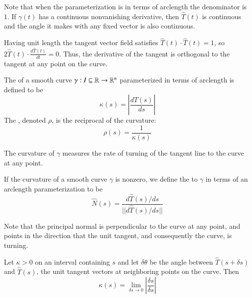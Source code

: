 \documentclass[12pt, a4paper, oneside, openright, titlepage]{book}
\begin{document}
\begin{appendices}
    Note that when the parameterization is in terms of arclength the denominator is $1$. If $\gamma(t)$ has a continuous nonvanishing derivative, then $\hat{T}(t)$ is continuous and the angle it makes with any fixed vector is also continuous.

    Having unit length the tangent vector field satisfies $\hat{T}(t)\cdot\hat{T}(t) = 1$, so $2\hat{T}(t)\cdot \frac{d\hat{T}(t)}{dt} = 0$. Thus, the derivative of the tangent is orthogonal to the tangent at any point on the curve.

    \begin{defn}
        The  of a smooth curve $\gamma:I\subseteq \mathbb R\rightarrow \mathbb R^n$ parameterized in terms of arclength is defined to be \begin{equation*}
            \kappa(s) = \left|\frac{d\hat{T}(s)}{ds}\right|
        \end{equation*}
        The , denoted $\rho$, is the reciprocal of the curvature: \begin{equation*}
            \rho(s) = \frac{1}{\kappa(s)}
        \end{equation*}
    \end{defn}

    The curvature of $\gamma$ measures the rate of turning of the tangent line to the curve at any point.

    \begin{defn}
        If the curvature of a smooth curve $\gamma$ is nonzero, we define the  to $\gamma$ in terms of an arclength parameterization to be \begin{equation*}
            \hat{N}(s) = \frac{d\hat{T}(s)/ds}{||d\hat{T}(s)/ds||}
        \end{equation*}
    \end{defn}

    Note that the principal normal is perpendicular to the curve at any point, and points in the direction that the unit tangent, and consequently the curve, is turning.

    \begin{thm}
        Let $\kappa > 0$ on an interval containing $s$ and let $\delta \theta$ be the angle between $\hat{T}(s+\delta s)$ and $\hat{T}(s)$, the unit tangent vectors at neighboring points on the curve. Then \begin{equation*}
            \kappa(s) = \lim\limits_{\delta s\rightarrow 0} \left|\frac{\delta s}{\delta s}\right|
        \end{equation*}
    \end{thm}


\end{appendices}
\end{document}
